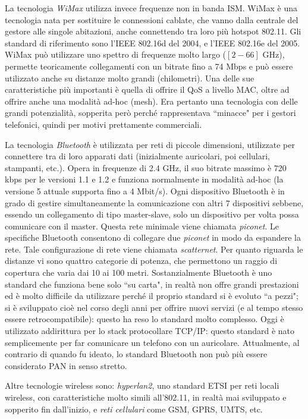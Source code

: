 La tecnologia \textit{WiMax} utilizza invece frequenze non in banda ISM. WiMax è una tecnologia nata per sostituire le connessioni cablate, che vanno dalla centrale del gestore alle singole abitazioni, anche connettendo tra loro più hotspot 802.11. Gli standard di riferimento sono l'IEEE 802.16d del 2004, e l'IEEE 802.16e del 2005. WiMax può utilizzare uno spettro di frequenze molto largo ($[2 - 66]$ GHz), permette teoricamente collegamenti con un bitrate fino a 74 Mbps e può essere utilizzato anche su distanze molto grandi (chilometri). Una delle sue caratteristiche più importanti è quella di offrire il QoS a livello MAC, oltre ad offrire anche una modalità ad-hoc (mesh). Era pertanto una tecnologia con delle grandi potenzialità, sopperita però perché rappresentava \textquotedblleft minacce" per i gestori telefonici, quindi per motivi prettamente commerciali.

La tecnologia \textit{Bluetooth} è utilizzata per reti di piccole dimensioni, utilizzate per connettere tra di loro apparati dati (inizialmente auricolari, poi cellulari, stampanti, etc.). Opera in frequenze di 2.4 GHz, il suo bitrate massimo è 720 kbps per le versioni 1.1 e 1.2 e funziona normalmente in modalità ad-hoc (la versione 5 attuale supporta fino a 4 Mbit/s). Ogni dispositivo Bluetooth è in grado di gestire simultaneamente la comunicazione con altri 7 dispositivi sebbene, essendo un collegamento di tipo master-slave, solo un dispositivo per volta possa comunicare con il master. Questa rete minimale viene chiamata \textit{piconet}. Le specifiche Bluetooth consentono di collegare due \textit{piconet} in modo da espandere la rete. Tale configurazione di rete viene chiamata \textit{scatternet}. Per quanto riguarda le distanze vi sono quattro categorie di potenza, che permettono un raggio di copertura che varia dai 10 ai 100 metri. Sostanzialmente Bluetooth è uno standard che funziona bene solo \textquotedblleft su carta", in realtà non offre grandi prestazioni ed è molto difficile da utilizzare perché il proprio standard si è evoluto \textquotedblleft a pezzi"; si è sviluppato cioè nel corso degli anni per offrire nuovi servizi (e al tempo stesso essere retrocompatibile): questo ha reso lo standard molto complesso. Oggi è utilizzato addirittura per lo stack protocollare TCP/IP: questo standard è nato semplicemente per far comunicare un telefono con un auricolare. Attualmente, al contrario di quando fu ideato, lo standard Bluetooth non può più essere considerato PAN in senso stretto.

Altre tecnologie wireless sono: \textit{hyperlan2}, uno standard ETSI per reti locali wireless, con caratteristiche molto simili all'802.11, in realtà mai sviluppato e sopperito fin dall'inizio, e \textit{reti cellulari} come GSM, GPRS, UMTS, etc.

